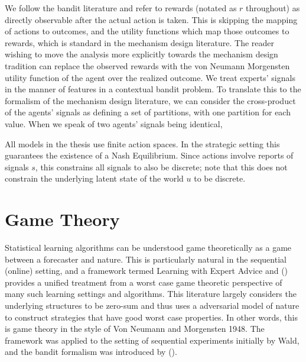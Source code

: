 We follow the bandit literature and refer to rewards (notated as $r$ throughout) as directly observable after the actual action is taken. This is skipping the mapping of actions to outcomes, and the utility functions which map those outcomes to rewards, which is standard in the mechanism design literature. The reader wishing to move the analysis more explicitly towards the mechanism design tradition can replace the observed rewards with the von Neumann Morgensten utility function of the agent over the realized outcome.
We treat experts' signals in the manner of features in a contextual bandit problem. To translate this to the formalism of the mechanism design literature, we can consider the cross-product of the agents' signals as defining a set of partitions, with one partition for each value.
When we speak of two agents' signals being identical, 


All models in the thesis use finite action spaces. 
In the strategic setting this guarantees the existence of a Nash Equilibrium. 
Since actions involve reports of signals $s$, this constrains all signals to also be discrete; note that this does not constrain the underlying latent state of the world $u$ to be discrete.


\section{Game Theory}

Statistical learning algorithms can be understood game theoretically as a game between a forecaster and nature. This is particularly natural in the sequential (online) setting, and a framework termed Learning with Expert Advice and (\cite{cesa2006prediction}) provides a unified treatment from a worst case game theoretic perspective of many such learning settings and algorithms.
This literature largely considers the underlying structures to be zero-sum and thus uses a adversarial model of nature to construct strategies that have good worst case properties. In other words, this is game theory in the style of Von Neumann and Morgensten 1948.
The framework was applied to the setting of sequential experiments initially by Wald, and the bandit formalism was introduced by (\cite{robbins1952some}).

